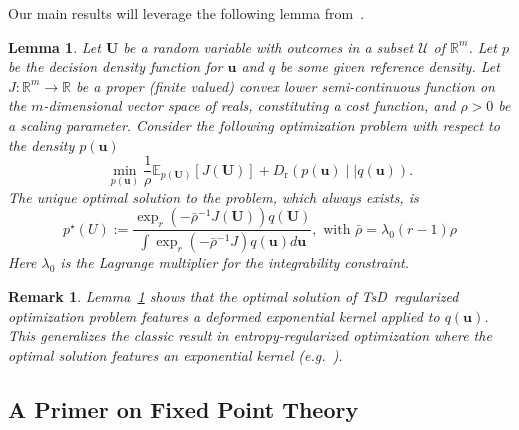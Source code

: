 \documentclass[a4paper,fleqn]{cas-sc}
\newcommand{\todoinb}[1]{\todo[inline,color=blue!20, linecolor=orange!250]{\small#1}}
\newcommand{\grtodo}[1]{\todoinb{\textbf{From GR:} #1}}
\newcommand{\R}{\mathbb{R}}
\newcommand{\bv}[1]{\mathbf{#1}}
\newcommand{\sU}{\mathcal{U}}
\newcommand{\Dr}[2]{{D}_{\text{r}}\left(#1\mid \mid #2 \right)}
\newcommand{\TsD}{TsD}
\newtheorem{lemma}[theorem]{Lemma}
\newtheorem{remark}[theorem]{Remark}
\begin{document}
Our main results will leverage the following lemma from~\cite{wang2021variational}.

\begin{lemma}\label{lem:densitysolution0}
Let $\bv{U}$ be a random variable with outcomes in a subset $\sU$ of $\R^{m}$. Let $p$  be the decision density function for $\bv{u}$ and $q$ be some given reference density. Let $J:\R^m\to\R$ be a proper (finite valued) convex lower semi-continuous function on the $m$-dimensional vector space of reals, constituting a cost function, and $\rho>0$ be a scaling parameter. Consider the following  optimization problem with respect to the density $p(\bv{u})$
    \begin{equation}\label{eq:gentsopt0}
\min_{p(\bv{u})} \frac{1}{\rho}\mathbb{E}_{p(\bv{U})} [J(\bv{U})] +\Dr{p(\bv{u})}{q(\bv{u})}.
    \end{equation}
The unique optimal solution to the problem, which always exists, is
    \begin{equation}\label{eq:gentssol0}
        p^\star(U):= \frac{\exp_r\left(-\bar{\rho}^{-1} J(\bv{U})\right)q(\bv{U})}{\int \exp_r\left(-\bar{\rho}^{-1} J\right)q(\bv{\bv{u}}) d\bv{u}},\,\,\text{with }\bar{\rho} = \lambda_0(r-1)\rho
    \end{equation}
    Here $\lambda_0$ is the Lagrange multiplier for the integrability constraint.
\end{lemma}
\begin{remark}
Lemma~\ref{lem:densitysolution0} shows that the optimal solution of \TsD~regularized optimization problem features a deformed exponential kernel applied to $q(\bv{u})$. This generalizes the classic result in entropy-regularized optimization where the optimal solution features an exponential kernel (e.g.~\cite[Lemma 1]{gagliardi2022probabilistic}).
\end{remark}


\subsection{A Primer on Fixed Point Theory}
\end{document}
